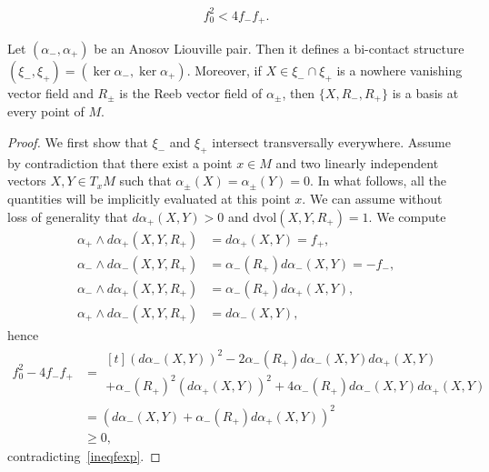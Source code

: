 \documentclass[10pt,a4paper]{amsart}
\begin{document}
\begin{align} \label{ineqfexp}
f_0^2 < 4 f_- f_+.
\end{align}

\begin{prop} \label{prop:anoliouv}
Let $(\alpha_-, \alpha_+)$ be an Anosov Liouville pair. Then it defines a bi-contact structure $(\xi_-,\xi_+) = (\ker \alpha_-, \ker \alpha_+)$. Moreover, if $X \in \xi_- \cap \xi_+$ is a nowhere vanishing vector field and $R_\pm$ is the Reeb vector field of $\alpha_\pm$, then $\{X, R_-, R_+\}$ is a basis at every point of $M$.
\end{prop}

\begin{proof}
We first show that $\xi_-$ and $\xi_+$ intersect transversally everywhere. Assume by contradiction that there exist a point $x \in M$ and two linearly independent vectors $X, Y \in T_xM$ such that $\alpha_\pm(X) = \alpha_\pm(Y) = 0$. In what follows, all the quantities will be implicitly evaluated at this point $x$. We can assume without loss of generality that $d \alpha_+(X,Y) >0$ and $\mathrm{dvol}(X,Y,R_+)=1$. We compute
\begin{align*}
\alpha_+ \wedge d\alpha_+ (X,Y,R_+) &= d\alpha_+(X,Y) = f_+, \\
\alpha_- \wedge d\alpha_- (X,Y,R_+) &= \alpha_-(R_+) d\alpha_-(X,Y) = -f_-,\\
\alpha_- \wedge d\alpha_+ (X,Y,R_+) &= \alpha_-(R_+) d\alpha_+(X,Y),\\
\alpha_+ \wedge d\alpha_- (X,Y,R_+) &= d\alpha_-(X,Y),
\end{align*}
hence
\begin{align*}
f_0^2 - 4f_-f_+ &= 
\begin{multlined}[t] (d\alpha_-(X,Y))^2 - 2 \alpha_-(R_+) d\alpha_-(X,Y) d\alpha_+(X,Y) \\+ \alpha_-(R_+)^2 (d\alpha_+(X,Y))^2  
+4 \alpha_-(R_+) d\alpha_-(X,Y) d\alpha_+(X,Y)
\end{multlined}\\
&= \left(d\alpha_-(X,Y) + \alpha_-(R_+) d\alpha_+(X,Y) \right)^2\\
&\geq 0,
\end{align*}
contradicting~\eqref{ineqfexp}.


\end{proof}
\end{document}
